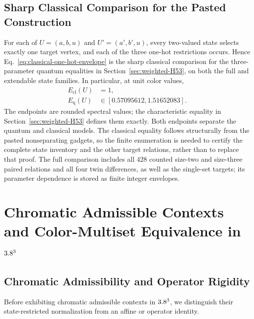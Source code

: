 \documentclass[aps,pra,reprint,superscriptaddress,longbibliography,nofootinbib,floatfix,10pt]{revtex4-2}
\theoremstyle{definition}\newtheorem{definition}[theorem]{Definition}
\theoremstyle{remark}\newtheorem{remark}[theorem]{Remark}
\begin{document}
\subsection{Sharp Classical Comparison for the Pasted Construction}\label{sec:classical-H53}

For each of $U=(a,b,u)$ and $U'=(a',b',u)$, every two-valued state selects exactly one target vertex, and each of the three one-hot restrictions occurs. Hence Eq.~\eqref{eq:classical-one-hot-envelope} is the sharp classical comparison for the three-parameter quantum equalities in Section~\ref{sec:weighted-H53}, on both the full and extendable state families. In particular, at unit color values,
\begin{equation}\label{eq:H53-classical-quantum-interval}
\begin{aligned}
E_{\mathrm{cl}}(U)&=1,\\
E_{\mathrm{q}}(U)&\in[0.57095612,1.51652083].
\end{aligned}
\end{equation}
The endpoints are rounded spectral values; the characteristic equality in Section~\ref{sec:weighted-H53} defines them exactly. Both endpoints separate the quantum and classical models. The classical equality follows structurally from the pasted nonseparating gadgets, so the finite enumeration is needed to certify the complete state inventory and the other target relations, rather than to replace that proof. The full comparison includes all $428$ counted size-two and size-three paired relations and all four twin differences, as well as the single-set targets; its parameter dependence is stored as finite integer envelopes.

\section{Chromatic Admissible Contexts and Color-Multiset Equivalence in \texorpdfstring{$3.8^3$}{R3}}\label{sec:complete-rainbow}

\subsection{Chromatic Admissibility and Operator Rigidity}\label{sec:no-go-operator}

Before exhibiting chromatic admissible contexts in $3.8^3$, we distinguish their state-restricted normalization from an affine or operator identity.
\end{document}
